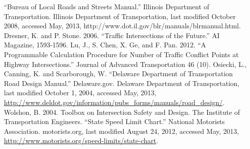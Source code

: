 \begin{thebibliography}{100}
 ``Bureau of Local Roads and Streets Manual.'' Illinois Department of Transportation. Illinois Department of Transportation, last modified October 2008, accessed May, 2013, http://www.dot.il.gov/blr/manuals/blrmanual.html.
 Dresner, K. and P. Stone. 2006. ``Traffic Intersections of the Future.'' AI Magazine, 1593-1596.
 Lu, J., S. Chen, X. Ge, and F. Pan. 2012. ``A Programmable Calculation Procedure for Number of Traffic Conflict Points at Highway Intersections.'' Journal of Advanced Transportation 46 (10).
 Osiecki, L., Canning, K. and Scarborough, W. ``Delaware Department of Transportation Road Design Manual.'' Delaware.gov. Delaware Department of Transportation, last modified October 1, 2004, accessed May, 2013, \url{http://www.deldot.gov/information/pubs_forms/manuals/road_design/}.
 Wolshon, B. 2004. Toolbox on Intersection Safety and Design. The Institute of Transportation Engineers.
 ``State Speed Limit Chart.'' National Motorists Association. motorists.org, last modified August 24, 2012, accessed May, 2013, \url{http://www.motorists.org/speed-limits/state-chart}.
\end{thebibliography}
